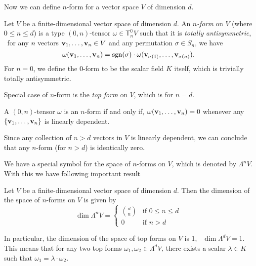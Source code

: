 Now we can define \(n\)-form for a vector space \(V\) of dimension \(d\).
\begin{definition}[\(n\)-form]
    Let \(V\) be a finite-dimensional vector space of dimension \(d\). An \emph{\(n\)-form} on \(V\) (where \(0 \le n \le d\)) is a type \((0, n)\)-tensor \(\omega \in \mathsf{T}^0_n V\) such that it is \emph{totally antisymmetric}, \ie\ for any \(n\) vectors \(\vb{v}_1, \ldots, \vb{v}_n \in V\) and any permutation \(\sigma \in S_n\), we have
    \begin{equation}
        \omega(\vb{v}_1, \ldots, \vb{v}_n) = \operatorname{sgn}(\sigma) \cdot \omega(\vb{v}_{\sigma(1)}, \ldots, \vb{v}_{\sigma(n)}).
    \end{equation}
    For \(n = 0\), we define the \(0\)-form to be the scalar field \(K\) itself, which is trivially totally antisymmetric.
\end{definition}
Special case of \(n\)-form is the \emph{top form} on \(V\), which is for \(n = d\).
\begin{proposition}
    A \((0, n)\)-tensor \(\omega\) is an \(n\)-form if and only if, \(\omega(\vb{v}_1, \ldots, \vb{v}_n) = 0\) whenever any \(\qty{\vb{v}_1, \ldots, \vb{v}_n}\) is linearly dependent.
\end{proposition}
Since any collection of \(n > d\) vectors in \(V\) is linearly dependent, we can conclude that any \(n\)-form (for \(n > d\)) is identically zero.

We have a special symbol for the space of \(n\)-forms on \(V\), which is denoted by \(\Lambda^n V\). With this we have following important result
\begin{theorem}
    Let \(V\) be a finite-dimensional vector space of dimension \(d\). Then the dimension of the space of \(n\)-forms on \(V\) is given by
    \begin{equation}
        \dim \Lambda^n V = \begin{cases}
            \binom{d}{n} & \text{if } 0 \le n \le d \\
            0            & \text{if } n > d
        \end{cases}
    \end{equation}
\end{theorem}
In particular, the dimension of the space of top forms on \(V\) is 1, \ie\ \(\dim \Lambda^d V = 1\). This means that for any two top forms \(\omega_1, \omega_2 \in \Lambda^d V\), there exists a scalar \(\lambda \in K\) such that \(\omega_1 = \lambda \cdot \omega_2\).

